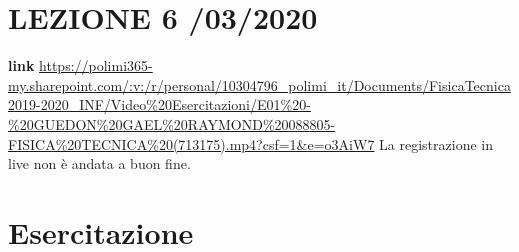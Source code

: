\section*{LEZIONE 6 /03/2020}
\textbf{link} \url{https://polimi365-my.sharepoint.com/:v:/r/personal/10304796_polimi_it/Documents/FisicaTecnica2019-2020_INF/Video%20Esercitazioni/E01%20-%20GUEDON%20GAEL%20RAYMOND%20088805-FISICA%20TECNICA%20(713175).mp4?csf=1&e=o3AiW7}\newline
La registrazione in live non è andata a buon fine.
\section*{Esercitazione}